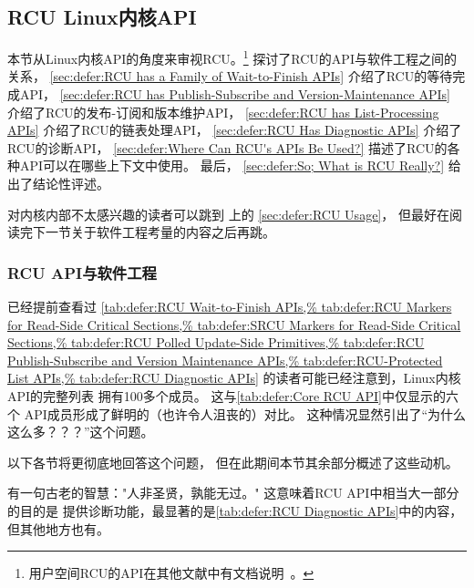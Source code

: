 
\subsection{RCU Linux内核API}
\label{sec:defer:RCU Linux-Kernel API}

本节从Linux内核API的角度来审视RCU。\footnote{
	用户空间RCU的API在其他文献中有文档说明~\cite{PaulMcKenney2013LWNURCU}。}
探讨了RCU的API与软件工程之间的关系，
\cref{sec:defer:RCU has a Family of Wait-to-Finish APIs}
介绍了RCU的等待完成API，
\cref{sec:defer:RCU has Publish-Subscribe and Version-Maintenance APIs}
介绍了RCU的发布-订阅和版本维护API，
\cref{sec:defer:RCU has List-Processing APIs}
介绍了RCU的链表处理API，
\cref{sec:defer:RCU Has Diagnostic APIs}
介绍了RCU的诊断API，
\cref{sec:defer:Where Can RCU's APIs Be Used?}
描述了RCU的各种API可以在哪些上下文中使用。
最后，
\cref{sec:defer:So; What is RCU Really?}
给出了结论性评述。

对内核内部不太感兴趣的读者可以跳到
上的
\cref{sec:defer:RCU Usage}，
但最好在阅读完下一节关于软件工程考量的内容之后再跳。

\subsubsection{RCU API与软件工程}
\label{sec:defer:RCU API and Software Engineering}

已经提前查看过
\cref{tab:defer:RCU Wait-to-Finish APIs,%
tab:defer:RCU Markers for Read-Side Critical Sections,%
tab:defer:SRCU Markers for Read-Side Critical Sections,%
tab:defer:RCU Polled Update-Side Primitives,%
tab:defer:RCU Publish-Subscribe and Version Maintenance APIs,%
tab:defer:RCU-Protected List APIs,%
tab:defer:RCU Diagnostic APIs}
的读者可能已经注意到，Linux内核API的完整列表
拥有100多个成员。
这与\cref{tab:defer:Core RCU API}中仅显示的六个
API成员形成了鲜明的（也许令人沮丧的）对比。
这种情况显然引出了``为什么这么多？？？''这个问题。

以下各节将更彻底地回答这个问题，
但在此期间本节其余部分概述了这些动机。

有一句古老的智慧："人非圣贤，孰能无过。"
这意味着RCU API中相当大一部分的目的是
提供诊断功能，最显著的是\cref{tab:defer:RCU Diagnostic APIs}中的内容，
但其他地方也有。

